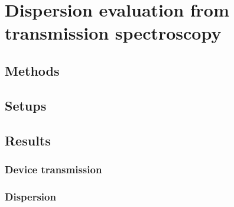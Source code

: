 
\chapter{Dispersion evaluation from transmission spectroscopy}


\section{Methods}

\section{Setups}


\section{Results}

\subsection{Device transmission}

\subsection{Dispersion}
